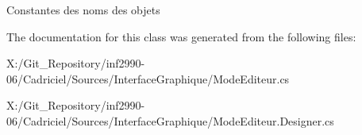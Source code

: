 Constantes des noms des objets 



The documentation for this class was generated from the following files\-:\begin{DoxyCompactItemize}
\item 
X\-:/\-Git\-\_\-\-Repository/inf2990-\/06/\-Cadriciel/\-Sources/\-Interface\-Graphique/Mode\-Editeur.\-cs\item 
X\-:/\-Git\-\_\-\-Repository/inf2990-\/06/\-Cadriciel/\-Sources/\-Interface\-Graphique/Mode\-Editeur.\-Designer.\-cs\end{DoxyCompactItemize}
